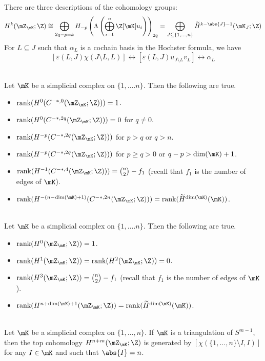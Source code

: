 \documentclass[a4paper]{article}
\begin{document}
There are three descriptions of the cohomology groups: $$H^k(\mZ_\mK;\Z)\cong\bigoplus_{2q-p=k}H_{-p}\left(\Lambda\left(\bigoplus_{i=1}^n\Z[\mK]u_i\right)\right)_{2q}=\bigoplus_{J\subseteq\{1,\dots,n\}}\widetilde{H}^{k-\abs{J}-1}(\mK_J;\Z)$$ For $L\subseteq J$ such that $\alpha_L$ is a cochain basis in the Hochster formula, we have $$[\varepsilon(L,J)\chi(J\setminus L,L)]\leftrightarrow[\varepsilon(L,J)u_{J\setminus L}v_L]\leftrightarrow\alpha_L$$

\begin{prp}{}{}\\
Let $\mK$ be a simplicial complex on $\{1,\dots.n\}$. Then the following are true. 
\begin{itemize}
\item $\text{rank}(H^0(C^{-\ast,0}(\mZ_\mK;\Z)))=1$. 
\item $\text{rank}(H^0(C^{-\ast,2q}(\mZ_\mK;\Z)))=0$ for $q\neq 0$.
\item $\text{rank}(H^{-p}(C^{-\ast,2q}(\mZ_\mK;\Z)))$ for $p>q$ or $q>n$. 
\item $\text{rank}(H^{-p}(C^{-\ast,2q}(\mZ_\mK;\Z)))$ for $p\geq q>0$ or $q-p>\dim(\mK)+1$. 
\item $\text{rank}(H^{-1}(C^{-\ast,4}(\mZ_\mK;\Z)))=\binom{n}{2}-f_1$ (recall that $f_1$ is the number of edges of $\mK$). 
\item $\text{rank}(H^{-(n-\dim(\mK)+1)}(C^{-\ast,2n}(\mZ_\mK;\Z)))=\text{rank}(\widetilde{H}^{\dim(\mK)}(\mK))$. 
\end{itemize}
\end{prp}

\begin{prp}{}{}\\
Let $\mK$ be a simplicial complex on $\{1,\dots.n\}$. Then the following are true. 
\begin{itemize}
\item $\text{rank}(H^0(\mZ_\mK;\Z))=1$. 
\item $\text{rank}(H^1(\mZ_\mK;\Z))=\text{rank}(H^2(\mZ_\mK;\Z))=0$. 
\item $\text{rank}(H^3(\mZ_\mK;\Z))=\binom{n}{2}-f_1$ (recall that $f_1$ is the number of edges of $\mK$). 
\item $\text{rank}(H^{n+\dim(\mK)+1}(\mZ_\mK;\Z))=\text{rank}(\widetilde{H}^{\dim(\mK)}(\mK))$. 
\end{itemize}
\end{prp}

\begin{lmm}{}{}\\
Let $\mK$ be a simplicial complex on $\{1,\dots,n\}$. If $\mK$ is a triangulation of $S^{m-1}$, then the top cohomology $H^{n+m}(\mZ_\mK;\Z)$ is generated by $[\chi(\{1,\dots,n\}\setminus I,I)]$ for any $I\in\mK$ and such that $\abs{I}=n$. 
\end{lmm}
\end{document}
